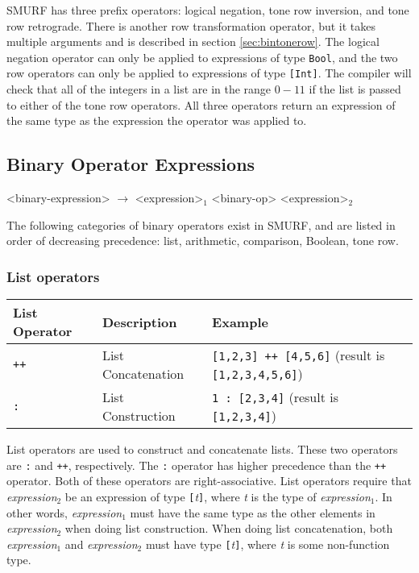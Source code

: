 SMURF has three prefix operators: logical negation, tone row inversion, and tone row retrograde.
There is another row transformation operator, but it takes multiple arguments and is described in
section \ref{sec:bintonerow}. The logical negation operator can only be applied to expressions of
type \texttt{Bool}, and the two row operators can only be applied to expressions of type
\texttt{[Int]}. The compiler will check that all of the integers in a list are in the range $0-11$
if the list is passed to either of the tone row operators.
All three operators return an expression of the same type as the expression the
operator was applied to.

\subsection{Binary Operator Expressions}
\label{sec:binaryop}
\begin{grammar}
<binary-expression> $\rightarrow$ <expression>$_1$ <binary-op> <expression>$_2$
\end{grammar}
The following categories of binary operators exist in SMURF, and are listed in order of decreasing
precedence: list, arithmetic, comparison, Boolean, tone row. 

\subsubsection{List operators}

\begin{table} [H]
\centering
\begin{tabular}{lll}
\hline\hline
List Operator & Description & Example \\
\hline\hline
   \texttt{++} & List Concatenation & \texttt{[1,2,3] ++ [4,5,6]} (result is \texttt{[1,2,3,4,5,6]}) \\ \hline
   \texttt{:} & List Construction & \texttt{1 : [2,3,4]} (result is \texttt{[1,2,3,4]}) \\ \hline
\end{tabular}
\end{table}

List operators are used to construct and concatenate lists. 
These two operators are \texttt{:} and \texttt{++}, respectively. The \texttt{:} operator has 
higher precedence than the \texttt{++} operator. Both of these operators are right-associative.
List operators require that  \emph{expression$_{2}$} be an expression of type 
\texttt{[}\emph{t}\texttt{]}, where \emph{t} is the type of \emph{expression$_{1}$}. 
In other words, \emph{expression$_{1}$} must have the same type 
as the other elements in \emph{expression$_{2}$} when doing list construction.
When doing list concatenation, both
\emph{expression$_{1}$} and \emph{expression$_{2}$} must have type \texttt{[}\emph{t}\texttt{]},
where \emph{t} is some non-function type. 

